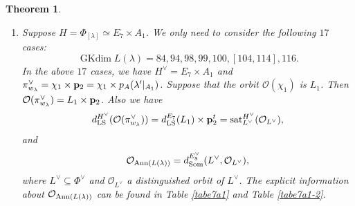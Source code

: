 \documentclass[reqno,12pt]{amsart}
\numberwithin{equation}{section}
\theoremstyle{plain}
\newtheorem{Thm}{Theorem}[section]
\newtheorem{Cor}[Thm]{Corollary}
\theoremstyle{definition}
\newcommand{\lam}{\lambda}
\renewcommand{\subset}{\subseteq}
\newcommand{\gkd}{\operatorname{GKdim}}
\begin{document}
\begin{Thm}
\begin{enumerate}
\item Suppose $H=\Phi_{[\lam]}\simeq E_7\times A_1$. We only need to consider the following $17$ cases:
$$\gkd L(\lam)=84,94,98,99,100,[104,114],116.$$
In the above $17$ cases, we have $H^{\vee}=E_7\times A_1$ and
$\pi^{\vee}_{w_{\lam}}={\chi}_{1}\times {\bf p}_{2}={\chi}_{1}\times p_{A}(\lam'|_{A_1})$. Suppose that the orbit $\mathcal{O}({\chi}_{1})$ is $L_{1}$. Then $\mathcal{O}(\pi_{w_\lambda}^\vee)=L_{1}\times {\bf p}_{2}$. Also we have
$$d_{\rm LS}^{H^\vee}(\mathcal{O}(\pi_{w_\lambda}^\vee)) =d_{\rm LS}^{E_7}(L_1)\times {\bf p}^t_{2}= {\rm sat}_{L^\vee}^{H^\vee}(\mathcal{O}_{L^\vee}),$$
and $$\mathcal{O}_{{\rm Ann}(L(\lambda))} = d_{\rm Som}^{E_8^\vee}(L^{\vee}, \mathcal{O}_{L^\vee}),$$
where $L^\vee \subset \Phi^\vee$ and $\mathcal{O}_{L^\vee}$ a distinguished orbit of $L^\vee$. The explicit information about $\mathcal{O}_{{\rm Ann}(L(\lambda))}$ can be found in Table \ref{tabe7a1} and  Table \ref{tabe7a1-2}.













\end{enumerate}

\end{Thm}

  
\end{document}
